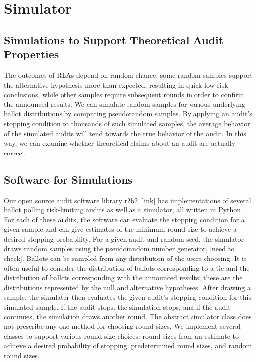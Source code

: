 \documentclass[runningheads]{llncs}
\begin{document}
\section{Simulator}
\subsection{Simulations to Support Theoretical Audit Properties}

The outcomes of RLAs depend on random chance; some random samples
support the alternative hypothesis more than expected, resulting in 
quick low-risk conclusions, while other samples require subsequent
rounds in order to confirm the announced results.
We can simulate random samples for various underlying ballot 
distributions by computing pseudorandom samples. 
By applying an audit's stopping condition to thousands of such
simulated samples, the average behavior of the simulated
audits will tend towards the true behavior of the audit.
In this way, we can examine whether theoretical claims about an audit are
actually correct.

\subsection{Software for Simulations}
Our open source audit software library r2b2 [link] has implementations of several ballot polling risk-limiting audits as well as a simulator, 
all written in Python.
For each of these audits, the software can evaluate the stopping condition for a given sample and can give estimates
of the minimum round size to achieve a desired stopping probability. 
For a given audit and random seed, the simulator draws random samples using the pseudorandom number generator, [need to check].
Ballots can be sampled from any distribution of the users choosing. 
It is often useful to consider the distribution of ballots corresponding to a tie and the 
distribution of ballots corresponding with the announced results; these are the distributions represented
by the null and alternative hypotheses.
After drawing a sample, the simulator then evaluates the given audit's stopping condition for this simulated sample.
If the audit stops, the simulation stops, and if the audit continues, the simulation draws another round. 
The abstract simulator class does not prescribe any one method for choosing round sizes. 
We implement several classes to support various round size choices: 
round sizes from an estimate to achieve a desired probability of stopping, 
predetermined round sizes, and random round sizes. 
\end{document}
